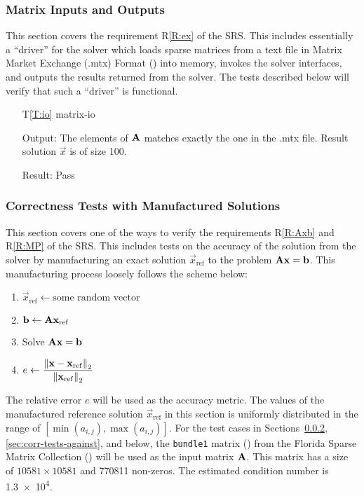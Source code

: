 \documentclass[12pt, titlepage]{article}
\newcommand{\rref}[1]{R\ref{#1}}
\newcommand{\tref}[1]{T\ref{#1}}
\begin{document}
\subsubsection{Matrix Inputs and Outputs}

This section covers the requirement \rref{R:ex} of the SRS. This includes
essentially a ``driver'' for the solver which loads sparse matrices from a text
file in Matrix Market Exchange (.mtx) Format (\cite{noauthor_matrix_2013}) into memory,
invokes the solver interfaces, and outputs the results returned from the solver.
The tests described below will verify that such a ``driver'' is functional.

\begin{itemize}

\item[\tref{T:io}]{matrix-io}

  Output: The elements of \(\mathbf{A}\) matches exactly the one in the .mtx file.
  Result solution \(\vec{x}\) is of size \num{100}.

  Result: Pass
\end{itemize}

\subsubsection{Correctness Tests with Manufactured Solutions}
\label{sec:corr-tests-with}

This section covers one of the ways to verify the requirements \rref{R:Axb} and
\rref{R:MP} of the SRS. This includes tests on the accuracy of the solution from
the solver by manufacturing an exact solution \(\vec{x}_\mathrm{ref}\) to the
problem \(\mathbf{A}\mathbf{x} = \mathbf{b}\). This manufacturing process loosely
follows the scheme below:

\begin{enumerate}
\item \(\vec{x}_\mathrm{ref} \gets \text{some random vector}\)
\item \(\mathbf{b} \gets \mathbf{A} \mathbf{x}_\mathrm{ref} \)
\item Solve \(\mathbf{A}\mathbf{x} = \mathbf{b}\)
\item \(e \gets \displaystyle \frac{\left\lVert\mathbf{x} - \mathbf{x}_\mathrm{ref}\right\rVert_2}{\left\lVert\mathbf{x}_\mathrm{ref}\right\rVert_2}\)
\end{enumerate}

The relative error \(e\) will be used as the accuracy metric. The values of the
manufactured reference solution \(\vec{x}_\mathrm{ref}\) in this section is
uniformly distributed in the range of \([\min(a_{i,j}), \max(a_{i,j})]\). For
the test cases in Sections~\ref{sec:corr-tests-with},
\ref{sec:corr-tests-against}, and below, the \texttt{bundle1} matrix
(\cite{m_lourakis_lourakisbundle1_2006}) from the Florida Sparse Matrix
Collection (\cite{davis_university_2011}) will be used as the input matrix
\(\mathbf{A}\). This matrix has a size of \(\num{10581} \times \num{10581}\) and
\num{770811} non-zeros. The estimated condition number is \num{1.3e4}.
\end{document}
